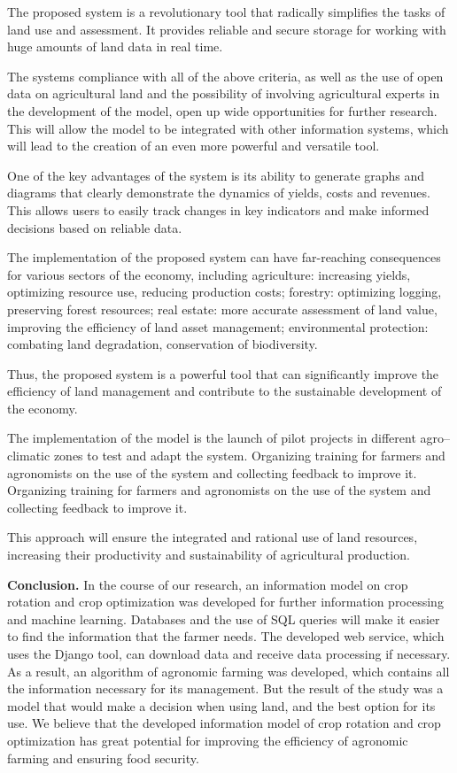 \begin{multicols}{2}
The proposed system is a revolutionary tool that radically simplifies
the tasks of land use and assessment. It provides reliable and secure
storage for working with huge amounts of land data in real time.

The system\textquotesingle s compliance with all of the above criteria,
as well as the use of open data on agricultural land and the possibility
of involving agricultural experts in the development of the model, open
up wide opportunities for further research. This will allow the model to
be integrated with other information systems, which will lead to the
creation of an even more powerful and versatile tool.

One of the key advantages of the system is its ability to generate
graphs and diagrams that clearly demonstrate the dynamics of yields,
costs and revenues. This allows users to easily track changes in key
indicators and make informed decisions based on reliable data.

The implementation of the proposed system can have far-reaching
consequences for various sectors of the economy, including agriculture:
increasing yields, optimizing resource use, reducing production costs;
forestry: optimizing logging, preserving forest resources; real estate:
more accurate assessment of land value, improving the efficiency of land
asset management; environmental protection: combating land degradation,
conservation of biodiversity.

Thus, the proposed system is a powerful tool that can significantly
improve the efficiency of land management and contribute to the
sustainable development of the economy.

The implementation of the model is the launch of pilot projects in
different agro--climatic zones to test and adapt the system. Organizing
training for farmers and agronomists on the use of the system and
collecting feedback to improve it. Organizing training for farmers and
agronomists on the use of the system and collecting feedback to improve
it.

This approach will ensure the integrated and rational use of land
resources, increasing their productivity and sustainability of
agricultural production.

{\bfseries Conclusion.} In the course of our research, an information model
on crop rotation and crop optimization was developed for further
information processing and machine learning. Databases and the use of
SQL queries will make it easier to find the information that the farmer
needs. The developed web service, which uses the Django tool, can
download data and receive data processing if necessary. As a result, an
algorithm of agronomic farming was developed, which contains all the
information necessary for its management. But the result of the study
was a model that would make a decision when using land, and the best
option for its use. We believe that the developed information model of
crop rotation and crop optimization has great potential for improving
the efficiency of agronomic farming and ensuring food security.


\end{multicols}
